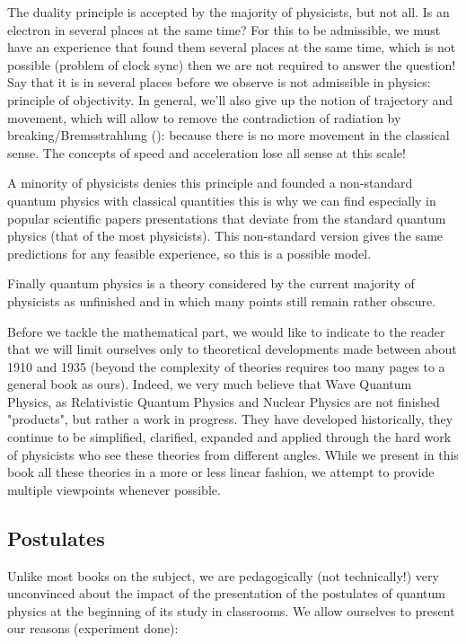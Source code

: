 	The duality principle is accepted by the majority of physicists, but not all. Is an electron in several places at the same time? For this to be admissible, we must have an experience that found them several places at the same time, which is not possible (problem of clock sync) then we are not required to answer the question! Say that it is in several places before we observe is not admissible in physics: principle of objectivity. In general, we'll also give up the notion of trajectory and movement, which will allow to remove the contradiction of radiation by breaking/Bremsstrahlung (): because there is no more movement in the classical sense. The concepts of speed and acceleration lose all sense at this scale!
	
	A minority of physicists denies this principle and founded a non-standard quantum physics with classical quantities this is why we can find especially in popular scientific papers presentations that deviate from the standard quantum physics (that of the most physicists). This non-standard version gives the same predictions for any feasible experience, so this is a possible model.
	
	Finally quantum physics is a theory considered by the current majority of physicists as unfinished and in which many points still remain rather obscure.
	
	Before we tackle the mathematical part, we would like to indicate to the reader that we will limit ourselves only to theoretical developments made between about 1910 and 1935 (beyond the complexity of theories requires too many pages to a general book as ours). Indeed, we very much believe that Wave Quantum Physics, as Relativistic Quantum Physics and Nuclear Physics are not finished "products", but rather a work in progress. They have developed historically, they continue to be simplified, clarified, expanded and applied through the hard work of physicists who see these theories from different angles. While we present in this book all these theories in a more or less linear fashion, we attempt to provide multiple viewpoints whenever possible.
	
	\subsection{Postulates}
	Unlike most books on the subject, we are pedagogically (not technically!) very unconvinced about the impact of the presentation of the postulates of quantum physics at the beginning of its study in classrooms. We allow ourselves to present our reasons (experiment done):
	
